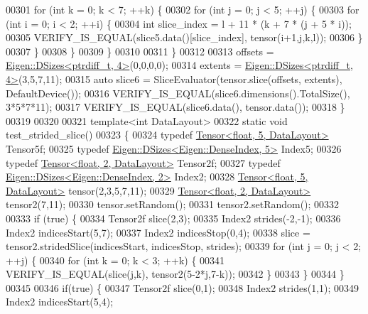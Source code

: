 \begin{DoxyCode}
00301       \textcolor{keywordflow}{for} (\textcolor{keywordtype}{int} k = 0; k < 7; ++k) \{
00302         \textcolor{keywordflow}{for} (\textcolor{keywordtype}{int} j = 0; j < 5; ++j) \{
00303           \textcolor{keywordflow}{for} (\textcolor{keywordtype}{int} i = 0; i < 2; ++i) \{
00304             \textcolor{keywordtype}{int} slice\_index = l + 11 * (k + 7 * (j + 5 * i));
00305             VERIFY\_IS\_EQUAL(slice5.data()[slice\_index], tensor(i+1,j,k,l));
00306           \}
00307         \}
00308       \}
00309     \}
00310 
00311   \}
00312 
00313   offsets = \hyperlink{struct_eigen_1_1_d_sizes}{Eigen::DSizes<ptrdiff\_t, 4>}(0,0,0,0);
00314   extents = \hyperlink{struct_eigen_1_1_d_sizes}{Eigen::DSizes<ptrdiff\_t, 4>}(3,5,7,11);
00315   \textcolor{keyword}{auto} slice6 = SliceEvaluator(tensor.slice(offsets, extents), DefaultDevice());
00316   VERIFY\_IS\_EQUAL(slice6.dimensions().TotalSize(), 3*5*7*11);
00317   VERIFY\_IS\_EQUAL(slice6.data(), tensor.data());
00318 \}
00319 
00320 
00321 \textcolor{keyword}{template}<\textcolor{keywordtype}{int} DataLayout>
00322 \textcolor{keyword}{static} \textcolor{keywordtype}{void} test\_strided\_slice()
00323 \{
00324   \textcolor{keyword}{typedef} \hyperlink{class_eigen_1_1_tensor}{Tensor<float, 5, DataLayout>} Tensor5f;
00325   \textcolor{keyword}{typedef} \hyperlink{struct_eigen_1_1_d_sizes}{Eigen::DSizes<Eigen::DenseIndex, 5>} Index5;
00326   \textcolor{keyword}{typedef} \hyperlink{class_eigen_1_1_tensor}{Tensor<float, 2, DataLayout>} Tensor2f;
00327   \textcolor{keyword}{typedef} \hyperlink{struct_eigen_1_1_d_sizes}{Eigen::DSizes<Eigen::DenseIndex, 2>} Index2;
00328   \hyperlink{class_eigen_1_1_tensor}{Tensor<float, 5, DataLayout>} tensor(2,3,5,7,11);
00329   \hyperlink{class_eigen_1_1_tensor}{Tensor<float, 2, DataLayout>} tensor2(7,11);
00330   tensor.setRandom();
00331   tensor2.setRandom();
00332 
00333   \textcolor{keywordflow}{if} (\textcolor{keyword}{true}) \{
00334     Tensor2f slice(2,3);
00335     Index2 strides(-2,-1);
00336     Index2 indicesStart(5,7);
00337     Index2 indicesStop(0,4);
00338     slice = tensor2.stridedSlice(indicesStart, indicesStop, strides);
00339     \textcolor{keywordflow}{for} (\textcolor{keywordtype}{int} j = 0; j < 2; ++j) \{
00340       \textcolor{keywordflow}{for} (\textcolor{keywordtype}{int} k = 0; k < 3; ++k) \{
00341         VERIFY\_IS\_EQUAL(slice(j,k), tensor2(5-2*j,7-k));
00342       \}
00343     \}
00344   \}
00345 
00346   \textcolor{keywordflow}{if}(\textcolor{keyword}{true}) \{
00347     Tensor2f slice(0,1);
00348     Index2 strides(1,1);
00349     Index2 indicesStart(5,4);

\end{DoxyCode}
